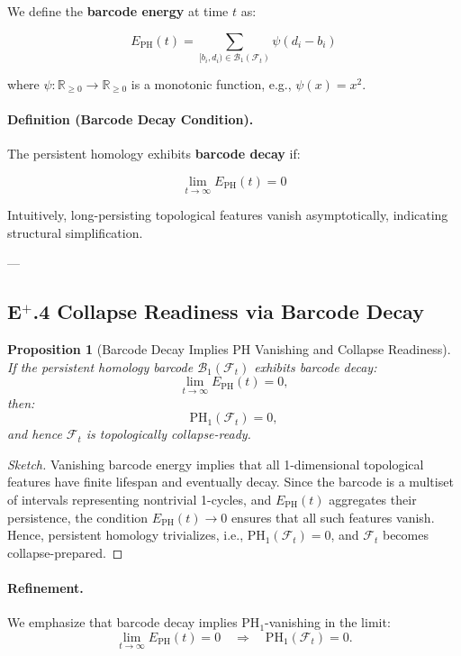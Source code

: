 \documentclass[11pt]{article}
\newtheorem{proposition}[theorem]{Proposition}
\begin{document}
We define the \textbf{barcode energy} at time $t$ as:

\[
E_{\mathrm{PH}}(t) = \sum_{[b_i, d_i) \in \mathcal{B}_1(\mathcal{F}_t)} \psi(d_i - b_i)
\]

where $\psi : \mathbb{R}_{\geq 0} \to \mathbb{R}_{\geq 0}$ is a monotonic function, e.g., $\psi(x) = x^2$.

\paragraph{Definition (Barcode Decay Condition).}

The persistent homology exhibits \textbf{barcode decay} if:

\[
\lim_{t \to \infty} E_{\mathrm{PH}}(t) = 0
\]

Intuitively, long-persisting topological features vanish asymptotically, indicating structural simplification.

---

\subsection*{E$^{+}$.4 Collapse Readiness via Barcode Decay}

\begin{proposition}[Barcode Decay Implies PH Vanishing and Collapse Readiness]
If the persistent homology barcode $\mathcal{B}_1(\mathcal{F}_t)$ exhibits barcode decay:
\[
\lim_{t \to \infty} E_{\mathrm{PH}}(t) = 0,
\]
then:
\[
\mathrm{PH}_1(\mathcal{F}_t) = 0,
\]
and hence $\mathcal{F}_t$ is topologically collapse-ready.
\end{proposition}

\begin{proof}[Sketch]
Vanishing barcode energy implies that all 1-dimensional topological features have finite lifespan and eventually decay. Since the barcode is a multiset of intervals representing nontrivial 1-cycles, and $E_{\mathrm{PH}}(t)$ aggregates their persistence, the condition $E_{\mathrm{PH}}(t) \to 0$ ensures that all such features vanish. Hence, persistent homology trivializes, i.e., $\mathrm{PH}_1(\mathcal{F}_t) = 0$, and $\mathcal{F}_t$ becomes collapse-prepared.
\end{proof}

\paragraph{Refinement.}
We emphasize that barcode decay implies PH$_1$-vanishing in the limit:
\[
\lim_{t \to \infty} E_{\mathrm{PH}}(t) = 0 \quad \Rightarrow \quad \mathrm{PH}_1(\mathcal{F}_t) = 0.
\]
\end{document}
